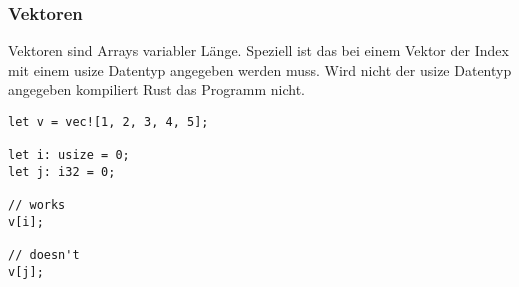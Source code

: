 \subsubsection{Vektoren}

Vektoren sind Arrays variabler Länge. Speziell ist das bei einem Vektor der Index mit einem usize Datentyp angegeben werden muss.
Wird nicht der usize Datentyp angegeben kompiliert Rust das Programm nicht.

\begin{lstlisting}
let v = vec![1, 2, 3, 4, 5];

let i: usize = 0;
let j: i32 = 0;

// works
v[i];

// doesn't
v[j];
\end{lstlisting}